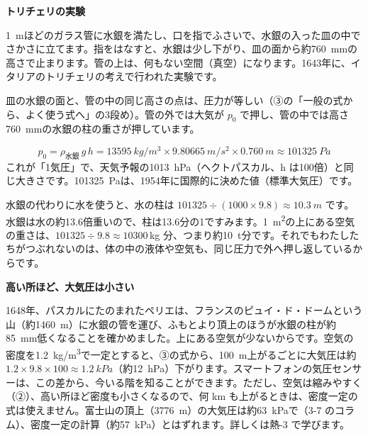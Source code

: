 \noindent\textbf{トリチェリの実験}\par\nobreak
\noindent\begin{minipage}[c]{0.36\linewidth}\centering
{}
\end{minipage}\hfill
\begin{minipage}[c]{0.61\linewidth}\raggedright
\qty{1}{m}ほどのガラス管に水銀を満たし、口を指でふさいで、水銀の入った皿の中でさかさに立てます。指をはなすと、水銀は少し下がり、皿の面から約\qty{760}{mm}の高さで止まります。管の上は、何もない空間（真空）になります。1643年に、イタリアのトリチェリの考えで行われた実験です。\par\vspace{3pt}
皿の水銀の面と、管の中の同じ高さの点は、圧力が等しい（③の「一般の式から、よく使う式へ」の3段め）。管の外では大気が $p_0$ で押し、管の中では高さ\qty{760}{mm}の水銀の柱の重さが押しています。
\end{minipage}
\[ p_0=\rho_{\text{水銀}}\,g\,h=\qty{13595}{kg/m^3}\times\qty{9.80665}{m/s^2}\times\qty{0.760}{m}\approx\qty{101325}{Pa} \]
\label{ph:力-12:taikiatsu}これが「1気圧」で、天気予報の\qty{1013}{hPa}（ヘクトパスカル、h は100倍）と同じ大きさです。\qty{101325}{Pa}は、1954年に国際的に決めた値（標準大気圧）です。

水銀の代わりに水を使うと、水の柱は $\num{101325}\div(1000\times9.8)\approx\qty{10.3}{m}$ です。水銀は水の約13.6倍重いので、柱は13.6分の1ですみます。\qty{1}{m^2}の上にある空気の重さは、$\num{101325}\div9.8\approx\num{10300}$\,kg 分、つまり約\qty{10}{t}分です。それでもわたしたちがつぶれないのは、体の中の液体や空気も、同じ圧力で外へ押し返しているからです。

\noindent\textbf{高い所ほど、大気圧は小さい}\par\nobreak
1648年、パスカルにたのまれたペリエは、フランスのピュイ・ド・ドームという山（約\qty{1460}{m}）に水銀の管を運び、ふもとより頂上のほうが水銀の柱が約\qty{85}{mm}低くなることを確かめました。上にある空気が少ないからです。空気の密度を\qty{1.2}{kg/m^3}で一定とすると、③の式から、\qty{100}{m}上がるごとに大気圧は約 $1.2\times9.8\times100\approx\qty{1.2}{kPa}$（約\qty{12}{hPa}）下がります。スマートフォンの気圧センサーは、この差から、今いる階を知ることができます。ただし、空気は縮みやすく（②）、高い所ほど密度も小さくなるので、何 km も上がるときは、密度一定の式は使えません。富士山の頂上（\qty{3776}{m}）の大気圧は約\qty{63}{kPa}で（3-7 のコラム）、密度一定の計算（約\qty{57}{kPa}）とはずれます。詳しくは熱-3 で学びます。

